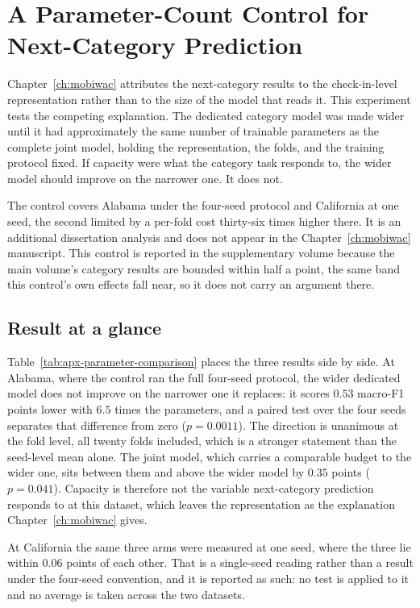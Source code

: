 \chapter{A Parameter-Count Control for Next-Category Prediction}
\label{apx:parameter-count-control}

Chapter~\ref{ch:mobiwac} attributes the next-category results to the check-in-level
representation rather than to the size of the model that reads it. This experiment tests the
competing explanation. The dedicated category model was made wider until it had approximately the
same number of trainable parameters as the complete joint model, holding the representation, the
folds, and the training protocol fixed. If capacity were what the category task responds to, the
wider model should improve on the narrower one. It does not.

The control covers Alabama under the four-seed protocol and California at one seed, the second
limited by a per-fold cost thirty-six times higher there. It is an additional dissertation analysis
and does not appear in the Chapter~\ref{ch:mobiwac} manuscript.
This control is reported in the supplementary volume because the main volume's category results are
bounded within half a point, the same band this control's own effects fall near, so it does not
carry an argument there.

\section{Result at a glance}
\label{sec:apx-parameter-summary}

Table~\ref{tab:apx-parameter-comparison} places the three results side by side. At Alabama, where
the control ran the full four-seed protocol, the wider dedicated model does not improve on the
narrower one it replaces: it scores $0.53$ macro-F1 points lower with $6.5$ times the parameters,
and a paired test over the four seeds separates that difference from zero ($p = 0.0011$). The
direction is unanimous at the fold level, all twenty folds included, which is a stronger statement
than the seed-level mean alone. The joint
model, which carries a comparable budget to the wider one, sits between them and above the wider
model by $0.35$ points ($p = 0.041$). Capacity is therefore not the variable next-category
prediction responds to at this dataset, which leaves the representation as the explanation
Chapter~\ref{ch:mobiwac} gives.

At California the same three arms were measured at one seed, where the three lie within $0.06$
points of each other. That is a single-seed reading rather than a result under the four-seed
convention, and it is reported as such: no test is applied to it and no average is taken across the
two datasets.

